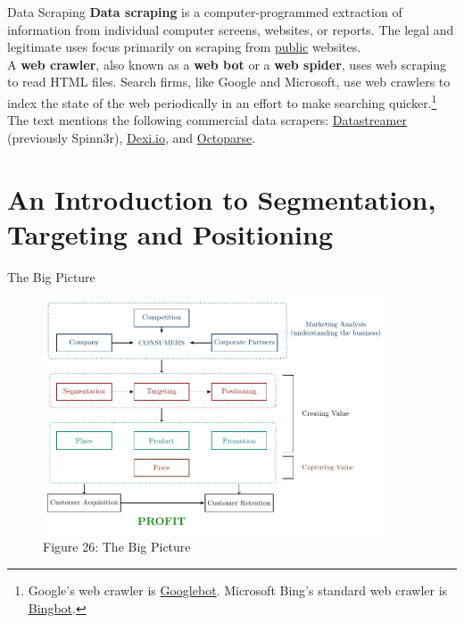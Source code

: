 \documentclass[pdf]{beamer}
\newcommand{\empr}[1]{{\color{franklinblue}\textbf{#1}}}
\theoremstyle{remark}
\theoremstyle{definition}
\begin{document}
\begin{frame}[t]{Data Scraping}
\empr{Data scraping} is a computer-programmed extraction of information from individual computer screens, websites, or reports. The legal and legitimate uses focus primarily on scraping from \underline{public} websites. \\
\vspace{1.5ex}
A \empr{web crawler}, also known as a \empr{web bot} or a \empr{web spider}, uses web scraping to read HTML files.  Search firms, like Google and Microsoft, use web crawlers to index the state of the web periodically in an effort to make searching quicker.\footnote{Google's web crawler is \href{https://developers.google.com/search/docs/crawling-indexing/googlebot}{Googlebot}. Microsoft Bing's standard web crawler is \href{https://www.bing.com/webmasters/help/which-crawlers-does-bing-use-8c184ec0}{Bingbot}.} \\
\vspace{1.5ex}
The text mentions the following commercial data scrapers: \href{https://datastreamer.io/}{Datastreamer} (previously Spinn3r), \href{https://www.dexi.io//}{Dexi.io}, and \href{https://www.octoparse.com/}{Octoparse}.
\end{frame}

\section{An Introduction to Segmentation, Targeting and Positioning }

\begin{frame}[t]{The Big Picture}
\begin{figure}[htbp]
  \captionsetup{justification=centering}
  \includegraphics[height=7cm, trim=0.0cm 0.0cm 0.0cm 0.0cm width=7cm]{Big_Picture.pdf}
  \caption{Figure {\color{franklinblue} 26}: The Big Picture}
\end{figure}

\end{frame}
\end{document}
